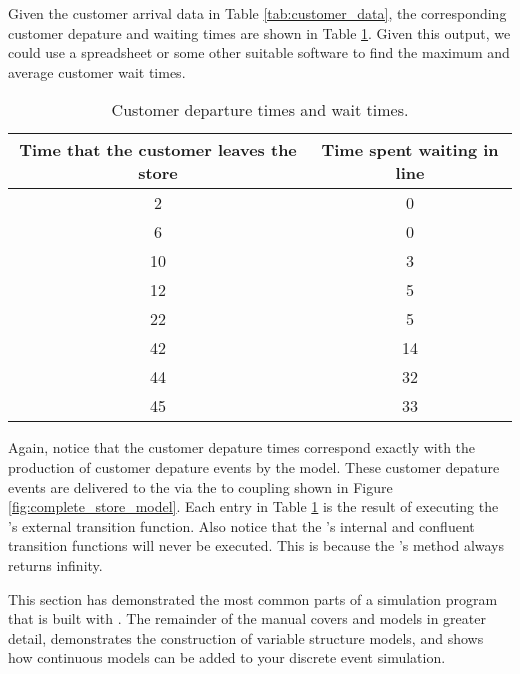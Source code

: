 Given the customer arrival data in Table \ref{tab:customer_data}, the corresponding customer depature and waiting times are
shown in Table \ref{tab:simulation_output}. Given this output, we could use a spreadsheet or
some other suitable software to find the maximum and average customer
wait times.
\begin{table}
\centering
\begin{tabular}{|c|c|}
\hline
Time that the customer leaves the store & Time spent waiting in line \\ \hline
2 & 0 \\ \hline
6 & 0 \\ \hline
10 & 3 \\ \hline
12 & 5 \\ \hline
22 & 5 \\ \hline
42 & 14 \\ \hline
44 & 32 \\ \hline
45 & 33 \\ \hline
\end{tabular}
\caption{Customer departure times and wait times.}
\label{tab:simulation_output}
\end{table}

Again, notice that the customer
depature times correspond exactly with the production of customer
depature events by the  model. These customer depature events
are delivered to the  via the  to 
coupling shown in Figure \ref{fig:complete_store_model}. Each entry in Table \ref{tab:simulation_output} is the result of
executing the 's external transition function.
Also notice that the 's internal and confluent transition functions will never be executed. This is because the
's  method always returns infinity.

This section has demonstrated the most common parts of a simulation program that is built with \adevs. The remainder of the manual covers  and  models in greater detail, demonstrates the construction of variable structure models, and shows how continuous models can be added to your discrete event simulation.
